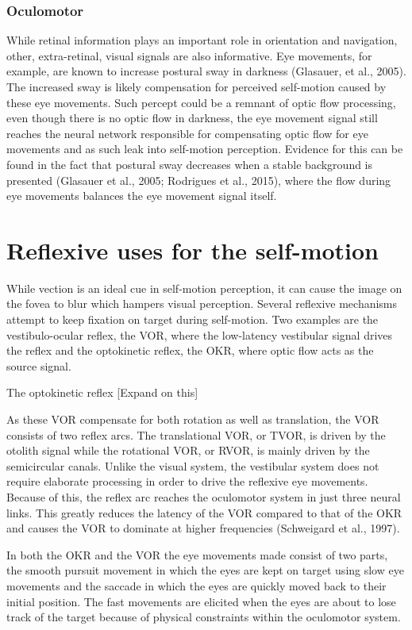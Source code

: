 \subsubsection{Oculomotor}
While retinal information plays an important role in orientation and navigation, other, extra-retinal, visual signals are also informative. Eye movements, for example, are known to increase postural sway in darkness (Glasauer, et al., 2005). The increased sway is likely compensation for perceived self-motion caused by these eye movements. Such percept could be a remnant of optic flow processing, even though there is no optic flow in darkness, the eye movement signal still reaches the neural network responsible for compensating optic flow for eye movements and as such leak into self-motion perception. Evidence for this can be found in the fact that postural sway decreases when a stable background is presented (Glasauer et al., 2005; Rodrigues et al., 2015), where the  flow during eye movements balances the eye movement signal itself.


\section{Reflexive uses for the self-motion}
While vection is an ideal cue in self-motion perception, it can cause the image on the fovea to blur which hampers visual perception. Several reflexive mechanisms attempt to keep fixation on target during self-motion. Two examples are the vestibulo-ocular reflex, the VOR, where the low-latency vestibular signal drives the reflex and the optokinetic reflex, the OKR, where optic flow acts as the source signal.

The optokinetic reflex [Expand on this]

As these VOR compensate for both rotation as well as translation, the VOR consists of two reflex arcs. The translational VOR, or TVOR, is driven by the otolith signal while the rotational VOR, or RVOR, is mainly driven by the semicircular canals. Unlike the visual system, the vestibular system does not require elaborate processing in order to drive the reflexive eye movements. Because of this, the reflex arc reaches the oculomotor system in just three neural links. This greatly reduces the latency of the VOR compared to that of the OKR and causes the VOR to dominate at higher frequencies (Schweigard et al., 1997).

In both the OKR and the VOR the eye movements made consist of two parts, the smooth pursuit movement in which the eyes are kept on target using slow eye movements and the saccade in which the eyes are quickly moved back to their initial position. The fast movements are elicited when the eyes are about to lose track of the target because of physical constraints within the oculomotor system.

